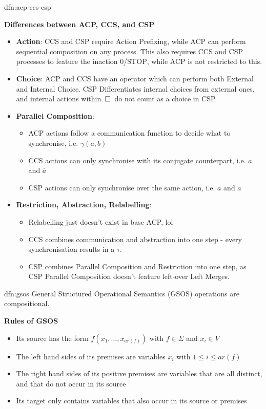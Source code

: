 \documentclass[landscape, 8pt]{extarticle}
\begin{document}
\begin{multicols}{3}
\begin{dfn}{dfn:acp-ccs-csp}{}
    \vspace{10pt}
    \longrule{0.08ex}

    \textbf{Differences between ACP, CCS, and CSP}
    \begin{itemize}
        \item \textbf{Action}: CCS and CSP require Action Prefixing, while ACP can perform sequential composition on any process. This also requires CCS and CSP processes to feature the inaction $0$/$\mathrm{STOP}$, while ACP is not restricted to this.
        \item \textbf{Choice}: ACP and CCS have an operator which can perform both External and Internal Choice. CSP Differentiates internal choices from external ones, and internal actions within $\,\square\,$ do not count as a choice in CSP.
        \item \textbf{Parallel Composition}:
            \begin{itemize}
                \item  ACP actions follow a communication function to decide what to synchronise, i.e. $\gamma(a, b)$
                \item CCS actions can only synchronise with its conjugate counterpart, i.e. $a$ and $\overline{a}$
                \item CSP actions can only synchronise over the same action, i.e. $a$ and $a$
            \end{itemize}
        \item \textbf{Restriction, Abstraction, Relabelling}:
            \begin{itemize}
                \item Relabelling just doesn't exist in base ACP, lol
                \item CCS combines communication and abstraction into one step - every synchronisation results in a $\tau$.
                \item CSP combines Parallel Composition and Restriction into one step, as CSP Parallel Composition doesn't feature left-over Left Merges.
            \end{itemize}
    \end{itemize}
\end{dfn}

\begin{dfn}{dfn:gsos}{}
    General Structured Operational Semantics (GSOS) operations are compositional.

    \textbf{Rules of GSOS}
    \begin{itemize}
        \item Its source has the form $f(x_{1},\dots,x_{ar(f)})$ with $f\in \Sigma$ and $x_{i}\in V$
        \item The left hand sides of its premises are variables $x_{i}$ with $1\le i \le ar(f)$
        \item The right hand sides of its positive premises are variables that are all distinct, and that do not occur in its source
        \item Its target only contains variables that also occur in its source or premises
    \end{itemize}



\end{dfn}
\end{multicols}
\end{document}
